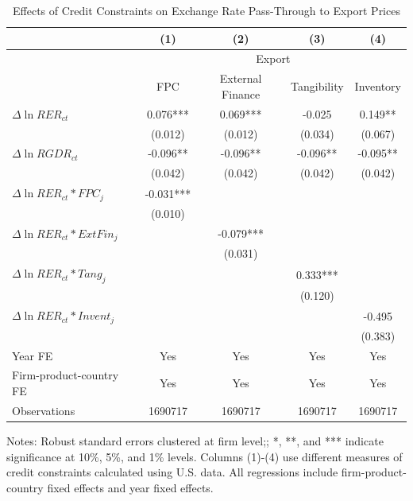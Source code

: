 \documentclass[12pt]{article}
\begin{document}
\begin{table}[htbp]
	\centering
	\caption{Effects of Credit Constraints on Exchange Rate Pass-Through to Export Prices}
	\begin{threeparttable}	
		\begin{tabular}{lcccc}
			\toprule
			& (1)   & (2)   & (3)   & (4) \\
			\midrule
			 & \multicolumn{4}{c}{Export} \\
			& FPC   & External Finance & Tangibility & Inventory \\
			\midrule
			$\Delta \ln RER_{ct}$ & 0.076*** & 0.069*** & -0.025 & 0.149** \\
			& (0.012) & (0.012) & (0.034) & (0.067) \\
			$\Delta \ln RGDR_{ct}$ & -0.096** & -0.096** & -0.096** & -0.095** \\
			& (0.042) & (0.042) & (0.042) & (0.042) \\
			$\Delta \ln RER_{ct}*FPC_{j}$ & -0.031*** &       &       &  \\
			& (0.010) &       &       &  \\
			$\Delta \ln RER_{ct}*ExtFin_{j}$ &       & -0.079*** &       &  \\
			&       & (0.031) &       &  \\
			$\Delta \ln RER_{ct}*Tang_{j}$ &       &       & 0.333*** &  \\
			&       &       & (0.120) &  \\
			$\Delta \ln RER_{ct}*Invent_{j}$ &       &       &       & -0.495 \\
			&       &       &       & (0.383) \\
			Year FE  & Yes   & Yes   & Yes   & Yes \\
			Firm-product-country FE & Yes   & Yes   & Yes   & Yes \\
			Observations & 1690717 & 1690717 & 1690717 & 1690717 \\
			\bottomrule
		\end{tabular}
		\begin{tablenotes}
			\footnotesize
			\item[Notes:] Robust standard errors clustered at firm level;; *, **, and *** indicate significance at 10\%, 5\%, and 1\% levels. Columns (1)-(4) use different measures of credit constraints calculated using U.S. data. All regressions include firm-product-country fixed effects and year fixed effects.
		\end{tablenotes}
	\end{threeparttable}
	\label{tab.credit.exp}
\end{table}
\end{document}
